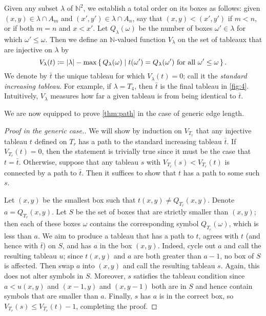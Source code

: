 \documentclass[11pt,reqno]{amsart}
\newcommand*{\N}{\mathbb{N}}
\newcommand*{\abs}[1]{{\lvert #1 \rvert}}
\newcommand*{\given}{\mid}
\newcommand*{\maps}{\nobreak\mskip2mu\mathpunct{}\nonscript
  \mkern-\thinmuskip{:}\mskip6muplus1mu\relax}
\newcommand*{\card}[1]{\abs{#1}}
\newcommand{\caelan}[1]{\textcolor{orange}{\sf C: [#1]}}
\theoremstyle{definition}
\theoremstyle{problem}
\theoremstyle{plain}
\theoremstyle{remark}
\theoremstyle{theorem}
\numberwithin{equation}{section}
\numberwithin{figure}{section}
\theoremstyle{definition}
\theoremstyle{problem}
\theoremstyle{plain}
\begin{document}
Given any subset $\lambda$ of $\N^2$, we establish a total order on
its boxes as follows: given $(x,y) \in \lambda \cap A_m$ and
$(x',y') \in \lambda \cap A_n$, say that $(x,y) < (x',y')$  if
$m < n$, or if both $m = n$ and $x < x'$.  Let
 $Q_{\lambda}(\omega)$
be the number of boxes $\omega' \in \lambda$ for which
$\omega' \leq \omega$.
%
Then we define an $\N$-valued function $V_{\lambda}$ on the set of
tableaux that are injective on $\lambda$ by
\begin{equation*}
  V_{\lambda}(t) \coloneq \card{\lambda} - \max \set{Q_{\lambda}(\omega)
    \given t(\omega') = Q_{\lambda}(\omega') \text{ for all }
    \omega' \leq \omega}.
\end{equation*}
We denote by $\bar{t}$ the unique tableau for which
$V_{\lambda}(t) = 0$; call it the \textit{standard increasing
  tableau}.  For example, if $\lambda = T_4$, then $\bar{t}$ is the
final tableau in \cref{fig:4}.  Intuitively, $V_{\lambda}$ measures
how far a given tableau is from being identical to $\bar{t}$.

We are now equipped to prove \cref{thm:path} in the case of generic
edge length.

\begin{proof}[Proof in the generic case.]
  We will show by induction on $V_{T_r}$ that any injective tableau
  $t$ defined on $T_r$ has a path to the standard increasing tableau
  $\bar{t}$.  If $V_{T_r}(t) = 0$, then the statement is trivially
  true since it must be the case that $t = \bar{t}$.  Otherwise,
  suppose that any tableau $s$ with $V_{T_r}(s) < V_{T_r}(t)$ is
  connected by a path to $\bar{t}$.  Then it suffices to show that $t$
  has a path to some such $s$.
  
  Let $(x,y)$ be the smallest box such that
  $t(x,y) \neq Q_{T_r}(x,y)$.  Denote $a =Q_{T_r}(x,y)$.  Let $S$ be
  the set of boxes that are strictly smaller than $(x,y)$; then each
  of these boxes $\omega$ contains the corresponding symbol
  $Q_{T_r}(\omega)$, which is less than $a$.  We aim to produce a
  tableau that has a path  to $t$, agrees with $t$ (and hence
  with $\bar{t}$) on $S$, and has $a$ in the box $(x,y)$.  Indeed,
  cycle out $a$ and call the resulting tableau $u$; since $t(x,y)$ and
  $a$ are both greater than $a - 1$, no box of $S$ is affected.  Then
  swap $a$ into $(x,y)$ and call the resulting tableau $s$.  Again,
  this does not alter symbols in $S$.  Moreover, $s$ satisfies the
  tableau condition since $a < u(x,y)$ and $(x-1,y)$ and $(x,y-1)$
  both are in $S$ and hence contain symbols that are smaller than $a$.
  Finally, $s$ has $a$ is in the correct box, so
  $V_{T_r}(s) \leq V_{T_r}(t) - 1$, completing the proof.
\end{proof}
\end{document}

